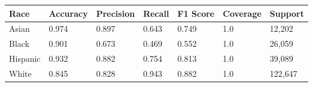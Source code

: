 \begin{tabular}{lllllll}
\toprule
Race & Accuracy & Precision & Recall & F1 Score & Coverage & Support \\
\midrule
Asian & 0.974 & 0.897 & 0.643 & 0.749 & 1.0 & 12,202 \\
Black & 0.901 & 0.673 & 0.469 & 0.552 & 1.0 & 26,059 \\
Hispanic & 0.932 & 0.882 & 0.754 & 0.813 & 1.0 & 39,089 \\
White & 0.845 & 0.828 & 0.943 & 0.882 & 1.0 & 122,647 \\
\bottomrule
\end{tabular}
